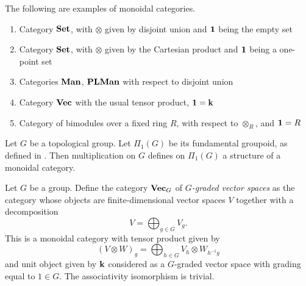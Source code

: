 \begin{example}\label{x:monoidal-cat-examples}
The following are examples of monoidal categories.
  \begin{enumerate}
    \item Category $\mathbf{Set}$, with $\otimes$ given by disjoint union and
      $\mathbf{1}$ being the empty set
    \item Category $\mathbf{Set}$, with $\otimes$ given by the Cartesian product
      and $\mathbf{1}$ being a one-point set
    \item Categories $\mathbf{Man}$, $\mathbf{PLMan}$ with respect to disjoint union
    \item Category $\mathbf{Vec}$ with the usual tensor product, $\mathbf{1} = \mathbf{k}$
    \item Category of bimodules over a fixed ring $R$, with respect
      to $\otimes_R$, and $\mathbf{1} = R$

  \end{enumerate}
\end{example}

\begin{example}\label{x:fund-group}
  Let $G$ be a topological group. Let $\Pi_1(G)$ be its fundamental groupoid,
  as defined in . Then multiplication on $G$
  defines on $\Pi_1(G)$ a structure of a monoidal category.
\end{example}


\begin{example}\label{x:vecg}
  Let $G$ be a group. Define the category $\mathbf{Vec}_G$ of \emph{$G$-graded vector
  spaces} as the category
  whose objects are finite-dimensional vector spaces $V$ together with
  a decomposition
  $$
    V=\bigoplus_{g\in G} V_g.
  $$
  This is a monoidal category with tensor product given by
  $$
    (V\otimes W)_g = \bigoplus_{h\in G} V_h \otimes W_{h^{-1}g}
  $$
  and unit object given by $\mathbf{k}$ considered as a $G$-graded vector space with
  grading equal to $1\in G$. The associativity isomorphism is trivial.
\end{example}



